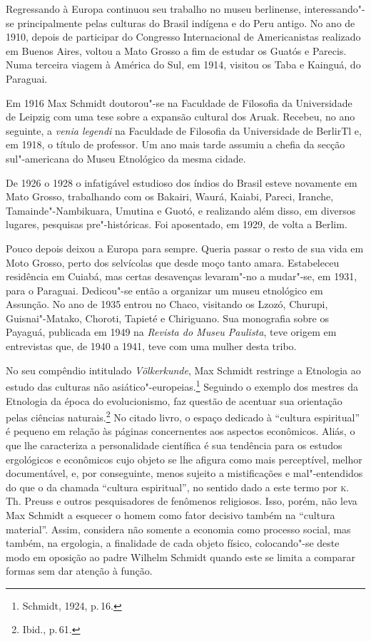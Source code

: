Regressando à Europa continuou seu trabalho no museu berlinense,
interessando"-se principalmente pelas culturas do Brasil indígena e do
Peru antigo. No ano de 1910, depois de participar do Congresso
Internacional de Americanistas realizado em Buenos Aires, voltou a Mato
Grosso a fim de estudar os Guatós e Parecis. Numa terceira viagem à
América do Sul, em 1914, visitou os Taba e Kainguá, do Paraguai.

Em 1916 Max Schmidt doutorou"-se na Faculdade de Filosofia da
Universidade de Leipzig com uma tese sobre a expansão cultural dos
Aruak. Recebeu, no ano seguinte, a \textit{venia legendi} na Faculdade de
Filosofia da Universidade de BerlirTl e, em 1918, o título de professor.
Um ano mais tarde assumiu a chefia da secção sul"-americana do Museu
Etnológico da mesma cidade.

De 1926 o 1928 o infatigável estudioso dos índios do Brasil esteve
novamente em Mato Grosso, trabalhando com os Bakairi, Waurá, Kaiabi,
Pareci, Iranche, Tamainde"-Nambikuara, Umutina e Guotó, e realizando além
disso, em diversos lugares, pesquisas pre"-históricas. Foi aposentado, em
1929, de volta a Berlim.

Pouco depois deixou a Europa para sempre. Queria passar o resto de sua
vida em Moto Grosso, perto dos selvícolas que desde moço tanto amara.
Estabeleceu residência em Cuiabá, mas certas desavenças levaram"-no a
mudar"-se, em 1931, para o Paraguai. Dedicou"-se então a organizar um
museu etnológico em Assunção. No ano de 1935 entrou no Chaco, visitando
os Lzozó, Churupi, Guisnai"-Matako, Choroti, Tapieté e Chiriguano. Sua
monografia sobre os Payaguá, publicada em 1949 na \textit{Revista do Museu
Paulista}, teve origem em entrevistas que, de 1940 a 1941, teve com uma
mulher desta tribo.


No seu compêndio intitulado \textit{Völkerkunde}, Max
Schmidt restringe a Etnologia ao estudo das culturas não
asiático"-europeias.\footnote{Schmidt, 1924, p.\,16.} Seguindo o exemplo dos mestres da Etnologia
da época do evolucionismo, faz questão de acentuar sua orientação pelas
ciências naturais.\footnote{Ibid., p.\,61.} No citado livro, o espaço dedicado à
``cultura espiritual'' é pequeno em relação às páginas concernentes aos
aspectos econômicos. Aliás, o que lhe caracteriza a personalidade
científica é sua tendência para os estudos ergológicos e econômicos cujo
objeto se lhe afigura como mais perceptível, melhor documentável, e, por
conseguinte, menos sujeito a mistificações e mal"-entendidos do que o da
chamada ``cultura espiritual'', no sentido dado a este termo por \textsc{k}.\,Th.
Preuss e outros pesquisadores de fenômenos religiosos. Isso, porém, não
leva Max Schmidt a esquecer o homem como fator decisivo também na
``cultura material''. Assim, considera não somente a economia como
processo social, mas também, na ergologia, a finalidade de cada objeto
físico, colocando"-se deste modo em oposição ao padre Wilhelm Schmidt
quando este se limita a comparar formas sem dar atenção à função.

